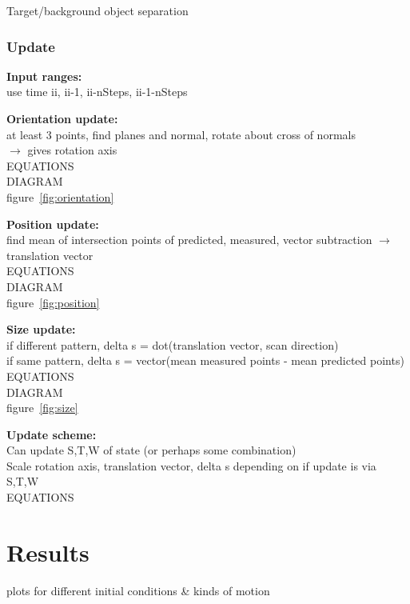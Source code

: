 		\IncMargin{2em}
		\begin{algorithm}
		\DontPrintSemicolon
	
		\caption{Target/background object separation}
		\end{algorithm}
		
	\subsubsection{Update}
		\textbf{Input ranges:}\\
		use time ii, ii-1, ii-nSteps, ii-1-nSteps
	
		\textbf{Orientation update:}\\
			at least 3 points, find planes and normal, rotate about cross of normals\\
			$\rightarrow$ gives rotation axis\\
			EQUATIONS\\
			DIAGRAM\\
			figure~\ref{fig:orientation}
			
			
		\textbf{Position update:}\\
			find mean of intersection points of predicted, measured, vector subtraction
			$\rightarrow$ translation vector\\
			EQUATIONS\\
			DIAGRAM\\
			figure~\ref{fig:position}
			
			
		\textbf{Size update:}\\
			if different pattern, delta s = dot(translation vector, scan direction)\\
			if same pattern, delta s = vector(mean measured points - mean predicted points)\\
			EQUATIONS\\
			DIAGRAM\\
			figure~\ref{fig:size}
			
			
		\textbf{Update scheme:}\\
			Can update S,T,W of state (or perhaps some combination)\\
			Scale rotation axis, translation vector, delta s depending on if update is via S,T,W\\
			EQUATIONS\\
			
			
\section{Results}
plots for different initial conditions \& kinds of motion
	
